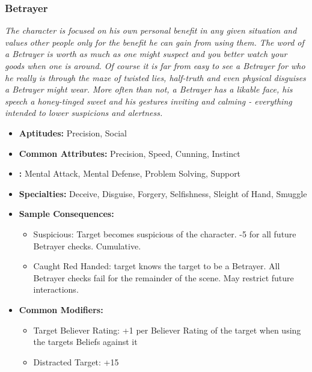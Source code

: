 	\subsubsection{Betrayer}\label{Betrayer}
		\textit{The character is focused on his own personal benefit in any given situation and values other people only for the benefit he can gain from using them.
		The word of a Betrayer is worth as much as one might suspect and you better watch your goods when one is around.
		Of course it is far from easy to see a Betrayer for who he really is through the maze of twisted lies, half-truth and even physical disguises a Betrayer might wear.
		More often than not, a Betrayer has a likable face, his speech a honey-tinged sweet and his gestures inviting and calming - everything intended to lower suspicions and alertness.}
		\begin{itemize}
			\item \textbf{Aptitudes:} Precision, Social
			\item \textbf{Common Attributes:}  Precision, Speed, Cunning, Instinct
			\item \textbf{:} Mental Attack, Mental Defense, Problem Solving, Support
			\item \textbf{Specialties:} Deceive, Disguise, Forgery, Selfishness, Sleight of Hand, Smuggle
			\item \textbf{Sample Consequences:} 
			\begin{itemize}
				\item Suspicious: Target becomes suspicious of the character. -5 for all future Betrayer checks. Cumulative.
				\item Caught Red Handed: target knows the target to be a Betrayer. All Betrayer checks fail for the remainder of the scene. May restrict future interactions.
			\end{itemize}
			\item \textbf{Common Modifiers:}
			\begin{itemize}
				\item Target Believer Rating: +1 per Believer Rating of the target when using the targets Beliefs against it
				\item Distracted Target: +15
			\end{itemize}
		\end{itemize}

